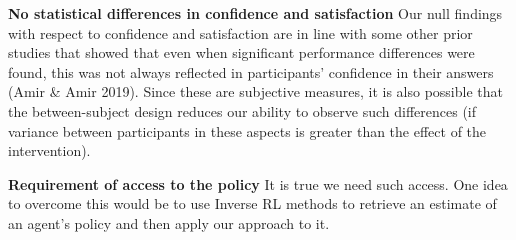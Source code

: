 \textbf{No statistical differences in confidence and satisfaction}
Our null findings with respect to confidence and satisfaction are in line with some other prior studies that showed that even when significant performance differences were found, this was not always reflected in participants’ confidence in their answers (Amir \& Amir 2019). Since these are subjective measures, it is also possible that the between-subject design reduces our ability to observe such differences (if variance between participants in these aspects is greater than the effect of the intervention).

\textbf{Requirement of access to the policy}
It is true we need such access. One idea to overcome this would be to use Inverse RL methods to retrieve an estimate of an agent's policy and then apply our approach to it. 


